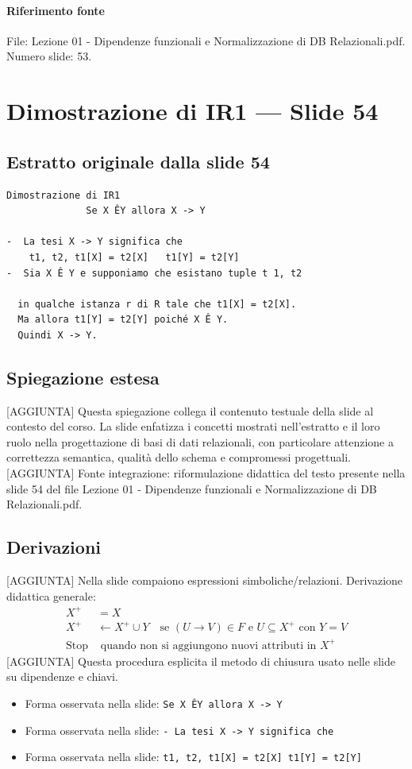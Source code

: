 \documentclass[11pt]{article}
\begin{document}
\paragraph{Riferimento fonte} File: Lezione 01 - Dipendenze funzionali e Normalizzazione di DB Relazionali.pdf. Numero slide: 53.
\section{Dimostrazione di IR1 --- Slide 54}
\subsection*{Estratto originale dalla slide 54}
\begin{lstlisting}
Dimostrazione di IR1
              Se X ÊY allora X -> Y

-  La tesi X -> Y significa che
    t1, t2, t1[X] = t2[X]   t1[Y] = t2[Y]
-  Sia X Ê Y e supponiamo che esistano tuple t 1, t2

  in qualche istanza r di R tale che t1[X] = t2[X].
  Ma allora t1[Y] = t2[Y] poiché X Ê Y.
  Quindi X -> Y.
\end{lstlisting}
\subsection*{Spiegazione estesa}
[AGGIUNTA] Questa spiegazione collega il contenuto testuale della slide al contesto del corso. La slide enfatizza i concetti mostrati nell'estratto e il loro ruolo nella progettazione di basi di dati relazionali, con particolare attenzione a correttezza semantica, qualità dello schema e compromessi progettuali.
[AGGIUNTA] Fonte integrazione: riformulazione didattica del testo presente nella slide 54 del file Lezione 01 - Dipendenze funzionali e Normalizzazione di DB Relazionali.pdf.
\subsection*{Derivazioni}
[AGGIUNTA] Nella slide compaiono espressioni simboliche/relazioni. Derivazione didattica generale:
\begin{align*}
X^+ &= X \\
X^+ &\leftarrow X^+ \cup Y \quad \text{se } (U \to V) \in F \text{ e } U \subseteq X^+ \text{ con } Y=V \\
\text{Stop} &\text{ quando non si aggiungono nuovi attributi in } X^+
\end{align*}
[AGGIUNTA] Questa procedura esplicita il metodo di chiusura usato nelle slide su dipendenze e chiavi.
\begin{itemize}[leftmargin=*]
\item Forma osservata nella slide: \texttt{Se X ÊY allora X -> Y}
\item Forma osservata nella slide: \texttt{-  La tesi X -> Y significa che}
\item Forma osservata nella slide: \texttt{t1, t2, t1[X] = t2[X]   t1[Y] = t2[Y]}
\end{itemize}
\end{document}
